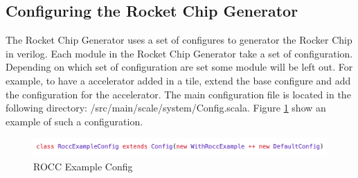 \documentclass[../main.tex]{subfiles}
\begin{document}
\subsection{Configuring the Rocket Chip Generator}
The Rocket Chip Generator uses a set of configures to generator the Rocker Chip in verilog. Each module in the Rocket Chip Generator take a set of configuration. Depending on which set of configuration are set some module will be left out. For example, to have a accelerator added in a tile, extend the base configure and add the configuration for the accelerator. The main configuration file is located in the following directory: /src/main/scale/system/Config.scala. Figure \ref{fig:configsnipit} show an example of such a configuration.
\begin{figure}
    \centering
    \includegraphics[scale=.4]{pngs/ConfigSnipit.png}
    \caption{ROCC Example Config}
    \label{fig:configsnipit}
\end{figure}
\end{document}
